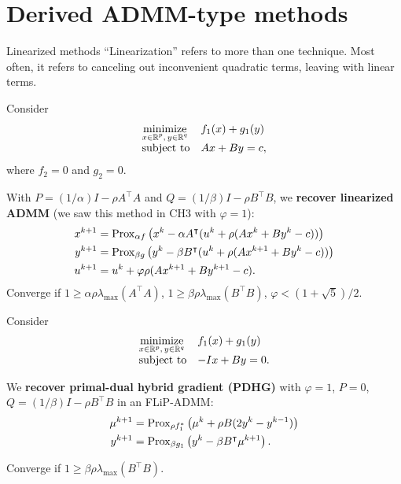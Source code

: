 \documentclass[10pt,mathserif]{beamer}
\begin{document}
\section{Derived ADMM-type methods}

\begin{frame}{Linearized methods}
``Linearization'' refers to more than one technique.
Most often, it refers to canceling out inconvenient quadratic terms, leaving with linear terms.
\medskip

Consider
\[
\begin{array}{ll}
\underset{\substack{x\in \mathbb{R}^p,\,y\in \mathbb{R}^q}}{\mbox{minimize}}&f_1(x)+g_1(y)\\
\mbox{subject to}&Ax+By=c,
\end{array}
\]
where $f_2=0$ and $g_2=0$.
\medskip

With $P=(1/\alpha)I-\rho A^\intercal  A$ and $Q=(1/\beta)I-\rho B^\intercal  B$, we \textbf{recover linearized ADMM} (we saw this method in CH3 with $\varphi=1$):
\begin{align*}
x^{k+1}&=
\mathrm{Prox}_{\alpha f}\left(x^k-\alpha A^\intercal ( u ^k+\rho (Ax^k+By^k-c))\right)\\
y^{k+1}&=
\mathrm{Prox}_{\beta g}\left(y^k-\beta B^\intercal ( u ^k+\rho (Ax^{k+1}+By^k-c) )\right)\\
 u ^{k+1}&= u ^{k}+\varphi\rho(Ax^{k+1}+By^{k+1}-c).
\end{align*}
Converge if $1\ge \alpha\rho\lambda_\mathrm{max}(A^\intercal  A)$, $1\ge \beta\rho\lambda_\mathrm{max}(B^\intercal  B)$, $\varphi<(1+\sqrt{5})/2$.
\end{frame}

\begin{frame}

Consider
\[
    \begin{array}{ll}
    \underset{x\in \mathbb{R}^p,\,y\in \mathbb{R}^q}{\mbox{minimize}}&f_1(x)+g_1(y)\\
    \mbox{subject to}&-Ix+By=0.
    \end{array}
\]
\medskip

We \textbf{recover primal-dual hybrid gradient (PDHG)} with $\varphi=1$, $P=0$, $Q=(1/\beta)I-\rho B^\intercal  B$ in an FLiP-ADMM:
\begin{align*}
\mu^{k+1}&=\mathrm{Prox}_{\rho  f^*_1}\left(\mu^k+\rho B(2y^k-y^{k-1})\right)\\
y^{k+1}&=\mathrm{Prox}_{\beta g_1}\left(y^k-\beta B^\intercal \mu^{k+1}\right).
\end{align*}

Converge if $1\ge \beta \rho\lambda_\mathrm{max}(B^\intercal  B)$.
\end{frame}
\end{document}
